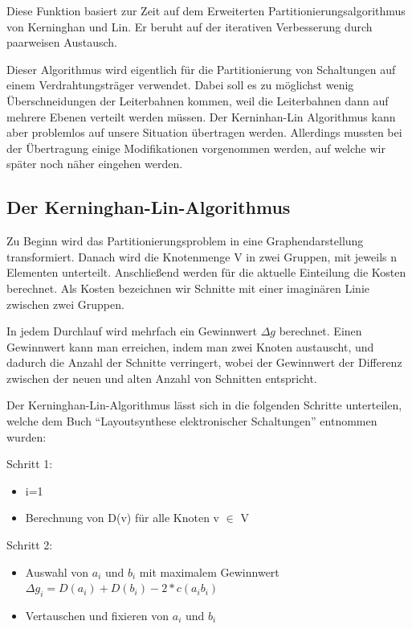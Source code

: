 Diese Funktion basiert zur Zeit auf dem Erweiterten Partitionierungsalgorithmus
von Kerninghan und Lin. Er beruht auf der iterativen Verbesserung durch
paarweisen Austausch.\vspace{10pt}

Dieser Algorithmus wird eigentlich für die Partitionierung von Schaltungen auf
einem Verdrahtungsträger verwendet. Dabei soll es zu möglichst wenig
Überschneidungen der Leiterbahnen kommen, weil die Leiterbahnen dann auf mehrere
Ebenen verteilt werden müssen. Der Kerninhan-Lin Algorithmus kann aber problemlos
auf unsere Situation übertragen werden. Allerdings mussten bei der Übertragung
einige Modifikationen vorgenommen werden, auf welche wir später noch näher
eingehen werden.\vspace{10pt}


\subsection{Der Kerninghan-Lin-Algorithmus}\label{KerninghanLin}

Zu Beginn wird das Partitionierungsproblem in eine Graphendarstellung
transformiert. Danach wird die Knotenmenge V in zwei Gruppen, mit jeweils n
Elementen unterteilt. Anschließend werden für die aktuelle Einteilung die Kosten
berechnet. Als Kosten bezeichnen wir Schnitte mit einer imaginären Linie
zwischen zwei Gruppen.\vspace{10pt}

In jedem Durchlauf wird mehrfach ein Gewinnwert $\Delta g$ berechnet. Einen
Gewinnwert kann man erreichen, indem man zwei Knoten austauscht, und dadurch
die Anzahl der Schnitte verringert, wobei der Gewinnwert der Differenz
zwischen der neuen und alten Anzahl von Schnitten entspricht.

Der Kerninghan-Lin-Algorithmus lässt sich in die folgenden Schritte
unterteilen, welche dem Buch "`Layoutsynthese elektronischer
Schaltungen"' \cite{Layout} entnommen wurden:\vspace{10pt}

Schritt 1:
\begin{itemize}
  \item i=1
  \item Berechnung von D(v) für alle Knoten v $\in$ V
\end{itemize}

Schritt 2:
\begin{itemize}
  \item Auswahl von $a_i$ und $b_i$ mit maximalem Gewinnwert $\Delta g_i =
  D(a_i) + D(b_i) - 2 * c(a_i b_i)$
  \item Vertauschen und fixieren von $a_i$ und $b_i$
\end{itemize}


